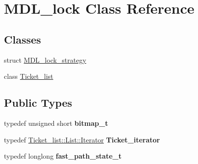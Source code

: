 \hypertarget{classMDL__lock}{}\section{M\+D\+L\+\_\+lock Class Reference}
\label{classMDL__lock}
\subsection*{Classes}
\begin{DoxyCompactItemize}
\item 
struct \mbox{\hyperlink{structMDL__lock_1_1MDL__lock__strategy}{M\+D\+L\+\_\+lock\+\_\+strategy}}
\item 
class \mbox{\hyperlink{classMDL__lock_1_1Ticket__list}{Ticket\+\_\+list}}
\end{DoxyCompactItemize}
\subsection*{Public Types}
\begin{DoxyCompactItemize}
\item 
\mbox{\label{classMDL__lock_af49d3a2db62c2c6dda844e0d4531ab12}} 
typedef unsigned short {\bfseries bitmap\+\_\+t}
\item 
\mbox{\label{classMDL__lock_a32cdf73e78c2f3288e20676e9ec19ea5}} 
typedef \mbox{\hyperlink{classI__P__List__iterator}{Ticket\+\_\+list\+::\+List\+::\+Iterator}} {\bfseries Ticket\+\_\+iterator}
\item 
\mbox{\label{classMDL__lock_afc52a5a78b9a3b911e91c2fcb932981a}} 
typedef longlong {\bfseries fast\+\_\+path\+\_\+state\+\_\+t}
\end{DoxyCompactItemize}
